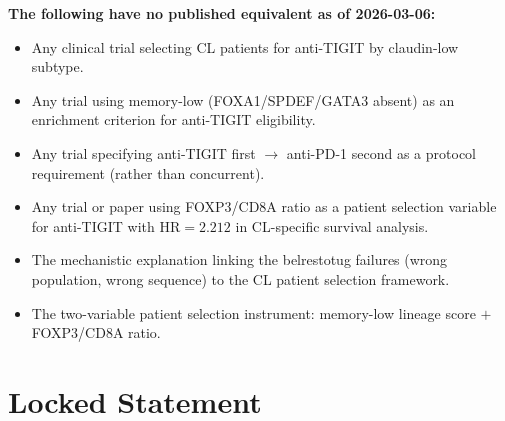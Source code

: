 \documentclass[12pt, a4paper]{article}
\begin{document}
\begin{center}
\colorbox{novelbox}{
\begin{minipage}{0.88\textwidth}
\vspace{0.5em}
\textbf{The following have no published equivalent
as of 2026-03-06:}
\begin{itemize}[noitemsep]
    \item Any clinical trial selecting CL patients
    for anti-TIGIT by claudin-low subtype.
    \item Any trial using memory-low (FOXA1/SPDEF/GATA3
    absent) as an enrichment criterion for
    anti-TIGIT eligibility.
    \item Any trial specifying anti-TIGIT first
    $\rightarrow$ anti-PD-1 second as a protocol
    requirement (rather than concurrent).
    \item Any trial or paper using FOXP3/CD8A
    ratio as a patient selection variable for
    anti-TIGIT with HR$=2.212$ in CL-specific
    survival analysis.
    \item The mechanistic explanation linking
    the belrestotug failures (wrong population,
    wrong sequence) to the CL patient selection
    framework.
    \item The two-variable patient selection
    instrument: memory-low lineage score $+$
    FOXP3/CD8A ratio.
\end{itemize}
\vspace{0.5em}
\end{minipage}}
\end{center}

\section{Locked Statement}
\end{document}
